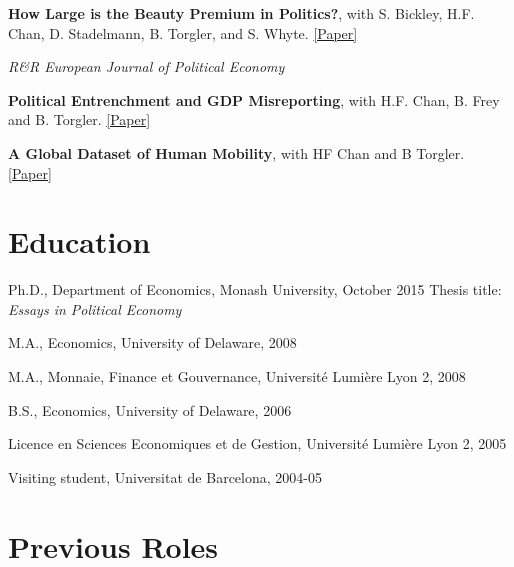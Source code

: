 \documentclass[letterpaper]{article}
\renewenvironment{itemize}{
  \begin{list}{}{
    \setlength{\leftmargin}{1.5em}
  }
}{
  \end{list}
}
\begin{document}
\begin{itemize}
	
		\medskip
	
	
	\item \textbf{How Large is the Beauty Premium in Politics?}, with S. Bickley, H.F. Chan, D. Stadelmann, B. Torgler, and S. Whyte.  \href{https://papers.ssrn.com/sol3/papers.cfm?abstract_id=4273311}{[Paper]}

								\begin{itemize}
							\item \textit{R\&R European Journal of Political Economy}
							\end{itemize}
 
				\medskip

	
	\item {\bf Political Entrenchment and GDP Misreporting}, with H.F. Chan, B. Frey and B. Torgler. 
 \href{https://www.cesifo.org/DocDL/cesifo1_wp7653.pdf}{[Paper]}

				\medskip	


\item \textbf{A Global Dataset of Human Mobility}, with HF Chan and B Torgler. \href{https://drive.google.com/file/d/1\_0UwLGb5UwmHztSybZu\_1er8125UCmy0/view}{[Paper]}	


 
\end{itemize}


\section*{Education}

\begin{itemize}
	\item Ph.D., Department of Economics, Monash University, October 2015
	\subitem Thesis title: {\emph{Essays in Political Economy}}
	\item M.A., Economics, University of Delaware, 2008 
	\item M.A., Monnaie, Finance et Gouvernance, Universit\'e Lumi\`ere Lyon 2, 2008
	\item B.S., Economics, University of Delaware, 2006
	\item Licence en Sciences Economiques et de Gestion, Universit\'e Lumi\`ere Lyon 2, 2005
	\item Visiting student, Universitat de Barcelona, 2004-05
\end{itemize}

\section*{ Previous Roles}
\end{document}

